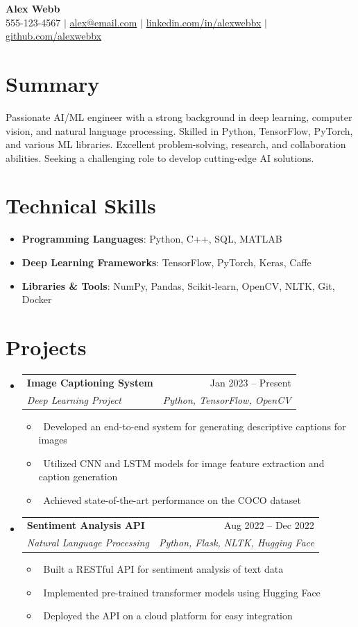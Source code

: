 \documentclass[letterpaper,10pt]{article}
\makeatletter
\newcommand{\resumeItem}[1]{\item\small{#1}}
\newcommand{\resumeSubheading}[4]{
\vspace{-1pt}\item
  \begin{tabular*}{0.97\textwidth}[t]{l@{\extracolsep{\fill}}r}
    \textbf{#1} & #2 \\
    \textit{#3} & \textit{#4} \\
  \end{tabular*}\vspace{-7pt}
}
\newcommand{\resumeSubHeadingList}{\begin{itemize}[leftmargin=0.15in, label={}]}
\newcommand{\resumeSubHeadingListEnd}{\end{itemize}}
\makeatother
\begin{document}
\begin{center}
  \textbf{\Huge Alex Webb} \\
  \small 555-123-4567 $|$ \href{mailto:alex@email.com}{alex@email.com} $|$ 
  \href{https://linkedin.com/in/burhan-webb}{linkedin.com/in/alexwebbx} $|$
  \href{https://github.com/zwayth}{github.com/alexwebbx}
\end{center}

\section*{Summary}
Passionate AI/ML engineer with a strong background in deep learning, computer vision, and natural language processing. Skilled in Python, TensorFlow, PyTorch, and various ML libraries. Excellent problem-solving, research, and collaboration abilities. Seeking a challenging role to develop cutting-edge AI solutions.

\section{Technical Skills}
\resumeSubHeadingList
  \resumeItem{\textbf{Programming Languages}: Python, C++, SQL, MATLAB}
  \resumeItem{\textbf{Deep Learning Frameworks}: TensorFlow, PyTorch, Keras, Caffe}
  \resumeItem{\textbf{Libraries \& Tools}: NumPy, Pandas, Scikit-learn, OpenCV, NLTK, Git, Docker}
\resumeSubHeadingListEnd

\section{Projects}
\resumeSubHeadingList
  \resumeSubheading
      {Image Captioning System}{Jan 2023 -- Present}
      {Deep Learning Project}{Python, TensorFlow, OpenCV}
      \resumeSubHeadingList
          \resumeItem{\textbullet\ Developed an end-to-end system for generating descriptive captions for images}
          \resumeItem{\textbullet\ Utilized CNN and LSTM models for image feature extraction and caption generation}
          \resumeItem{\textbullet\ Achieved state-of-the-art performance on the COCO dataset}
      \resumeSubHeadingListEnd
  \resumeSubheading
      {Sentiment Analysis API}{Aug 2022 -- Dec 2022} 
      {Natural Language Processing}{Python, Flask, NLTK, Hugging Face}
      \resumeSubHeadingList
          \resumeItem{\textbullet\ Built a RESTful API for sentiment analysis of text data}
          \resumeItem{\textbullet\ Implemented pre-trained transformer models using Hugging Face}
          \resumeItem{\textbullet\ Deployed the API on a cloud platform for easy integration}
      \resumeSubHeadingListEnd
\resumeSubHeadingListEnd
\end{document}
